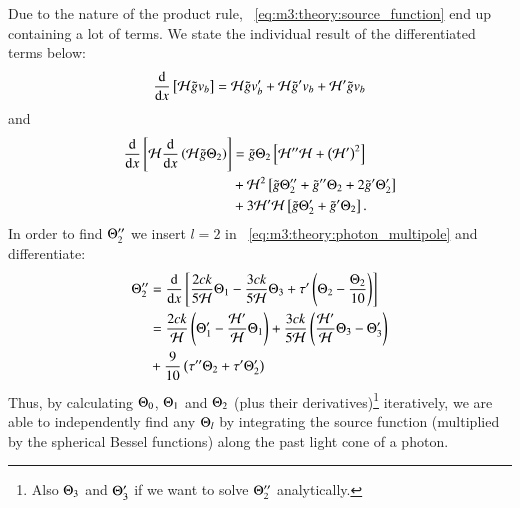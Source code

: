     Due to the nature of the product rule, ~\cref{eq:m3:theory:source_function} end up containing a lot of terms. We state the individual result of the differentiated terms below:
    \begin{equation}\label{eq:m3:theory:dvHgv_b}
        \dv{}{x}\left[\mathcal{H}\tilde{g}v_b\right] = \mathcal{H}\tilde{g}v_b' + \mathcal{H}\tilde{g}'v_b + \mathcal{H}'\tilde{g}v_b
    \end{equation}
    and
    \begin{equation}\label{eq:m3:theory:dvHdvHgT}
        \begin{split}
            \dv{}{x}\left[\mathcal{H}\dv{}{x}\left(\mathcal{H}\tilde{g}\Theta_2\right)\right] &= \tilde{g}\Theta_2\left[\mathcal{H}''\mathcal{H} + \left(\mathcal{H}'\right)^2\right] \\
            &+\mathcal{H}^2\left[\tilde{g}\Theta_2'' + \tilde{g}''\Theta_2 + 2\tilde{g}'\Theta_2'\right] \\
            &+3\mathcal{H}'\mathcal{H}\left[\tilde{g}\Theta_2'+\tilde{g}'\Theta_2\right].
        \end{split}
    \end{equation}
    In order to find $\Theta_2''$ we insert $l=2$ in ~\cref{eq:m3:theory:photon_multipole} and differentiate:
    \begin{equation}\label{eq:m3:theory:dipole_double_deriv}
        \begin{split}
            \Theta_2'' &= \dv{}{x}\left[\frac{2ck}{5\mathcal{H}}\Theta_1-\frac{3ck}{5\mathcal{H}}\Theta_3 + \tau'\left(\Theta_2-\frac{\Theta_2}{10}\right)\right] \\
            &= \frac{2ck}{\mathcal{H}}\left(\Theta_1'-\frac{\mathcal{H}'}{\mathcal{H}}\Theta_1\right) + \frac{3ck}{5\mathcal{H}}\left(\frac{\mathcal{H}'}{\mathcal{H}}\Theta_3 - \Theta_3'\right)\\
            &+ \frac{9}{10}\left(\tau''\Theta_2 + \tau'\Theta_2'\right)
        \end{split}
    \end{equation}
    Thus, by calculating $\Theta_0$, $\Theta_1$ and $\Theta_2$ (plus their derivatives)\footnote{Also $\Theta_3$ and $\Theta_3'$ if we want to solve $\Theta_2''$ analytically.} iteratively, we are able to independently find any $\Theta_l$ by integrating the source function (multiplied by the spherical Bessel functions) along the past light cone of a photon. 


